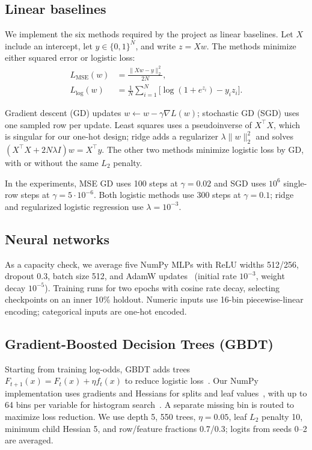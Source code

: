 \documentclass[10pt,conference,compsocconf]{IEEEtran}
\begin{document}
\subsection{Linear baselines}
We implement the six methods required by the project as linear
baselines. Let $X$ include an intercept, let $y\in\{0,1\}^N$, and
write $z=Xw$. The methods minimize either squared error or logistic
loss:
\begin{align}
 L_{\mathrm{MSE}}(w)&=\frac{\lVert Xw-y\rVert_2^2}{2N},\\
 L_{\mathrm{log}}(w)&=\frac1N\sum_{i=1}^{N}
       \bigl[\log(1+e^{z_i})-y_i z_i\bigr].
\end{align}

Gradient descent (GD) updates $w\leftarrow w-\gamma\nabla L(w)$;
stochastic GD (SGD) uses one sampled row per update. Least squares uses a
pseudoinverse of $X^\top X$, which is singular for our one-hot design;
ridge adds a regularizer $\lambda\lVert w\rVert_2^2$ and solves
$(X^\top X+2N\lambda I)w=X^\top y$. The other two methods minimize logistic loss by GD, with or without
the same $L_2$ penalty.

In the experiments, MSE GD uses 100 steps at $\gamma=0.02$ and SGD
uses $10^6$ single-row steps at $\gamma=5\cdot10^{-6}$. Both logistic
methods use 300 steps at $\gamma=0.1$; ridge and regularized logistic
regression use $\lambda=10^{-3}$.

\subsection{Neural networks}
As a capacity check, we average five NumPy MLPs with ReLU widths 512/256,
dropout 0.3, batch size 512, and AdamW updates~\cite{loshchilov2019adamw} (initial rate $10^{-3}$,
weight decay $10^{-5}$). Training runs for two epochs with cosine rate
decay, selecting checkpoints on an inner 10\% holdout. Numeric inputs use
16-bin piecewise-linear encoding; categorical inputs are one-hot encoded.

\subsection{Gradient-Boosted Decision Trees (GBDT)}
Starting from training log-odds, GBDT adds trees
$F_{t+1}(x)=F_t(x)+\eta f_t(x)$ to reduce logistic
loss~\cite{friedman2001greedy}. Our NumPy implementation uses gradients
and Hessians for splits and leaf values~\cite{chen2016xgboost}, with
up to 64 bins per variable for histogram search~\cite{ke2017lightgbm}.
A separate missing bin is routed to maximize loss reduction. We use depth 5, 550
trees, $\eta=0.05$, leaf $L_2$ penalty 10, minimum child Hessian 5,
and row/feature fractions 0.7/0.3; logits from seeds 0--2 are averaged.
\end{document}
